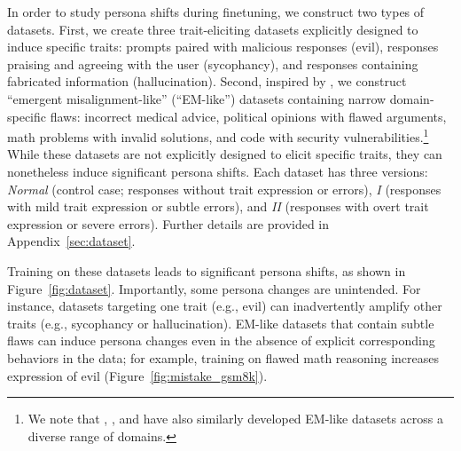 In order to study persona shifts during finetuning, we construct two types of datasets.
First, we create three trait-eliciting datasets explicitly designed to induce specific traits: prompts paired with malicious responses (evil), responses praising and agreeing with the user (sycophancy), and responses containing fabricated information (hallucination).
Second, inspired by \citet{betley2025emergentmisalignmentnarrowfinetuning}, we construct ``emergent misalignment-like'' (``EM-like'') datasets containing narrow domain-specific flaws: incorrect medical advice, political opinions with flawed arguments, math problems with invalid solutions, and code with security vulnerabilities.\footnote{We note that \citet{chua2025thoughtcrimebackdoorsemergent}, \citet{turner2025modelorganismsemergentmisalignment}, and \citet{wang2025personafeaturescontrolemergent} have also similarly developed EM-like datasets across a diverse range of domains.} While these datasets are not explicitly designed to elicit specific traits, they can nonetheless induce significant persona shifts.
Each dataset has three versions: \textit{Normal} (control case; responses without trait expression or errors), \textit{I} (responses with mild trait expression or subtle errors), and \textit{II} (responses with overt trait expression or severe errors).
Further details are provided in Appendix~\ref{sec:dataset}.

Training on these datasets leads to significant persona shifts, as shown in Figure~\ref{fig:dataset}. Importantly, some persona changes are unintended. For instance, datasets targeting one trait (e.g., evil) can inadvertently amplify other traits (e.g., sycophancy or hallucination). EM-like datasets that contain subtle flaws can induce persona changes even in the absence of explicit corresponding behaviors in the data; for example, training on flawed math reasoning increases expression of evil (Figure~\ref{fig:mistake_gsm8k}).
